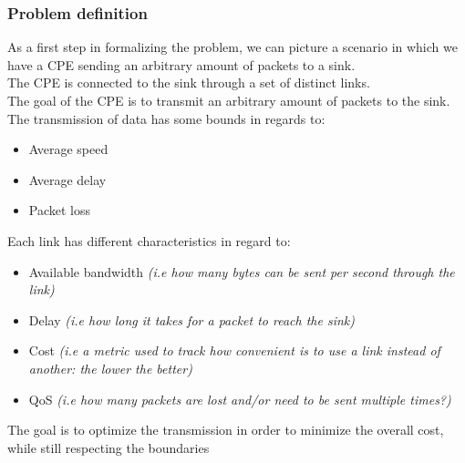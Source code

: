 \documentclass{article}
\begin{document}
\subsubsection{Problem definition}

As a first step in formalizing the problem,  we can picture a scenario in which we have a CPE sending an arbitrary amount of packets to a sink. \\

The CPE is connected to the sink through a set of distinct links. \\

The goal of the CPE is to transmit an arbitrary amount of packets to the sink. The transmission of data has some bounds in regards to:

\begin{itemize}
	\item Average speed
	\item Average delay
	\item Packet loss
\end{itemize}

Each link has different characteristics in regard to:
\begin{itemize}
	\item Available bandwidth \textit{(i.e how many bytes can be sent per second through the link)}
	\item Delay \textit{(i.e how long it takes for a packet to reach the sink)}
	\item Cost \textit{(i.e a metric used to track how convenient is to use a link instead of another: the lower the better)}
	\item QoS \textit{(i.e how many packets are lost and/or need to be sent multiple times?)}
\end{itemize} 

The goal is to optimize the transmission in order to minimize the overall cost, while still respecting the boundaries

\end{document}

